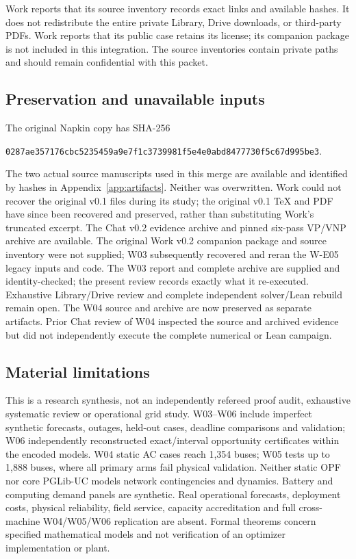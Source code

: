 \documentclass[11pt,letterpaper]{article}
\begin{document}
Work reports that its source inventory records exact links and available hashes. It does not redistribute the entire private Library, Drive downloads, or third-party PDFs. Work reports that its public case retains its license; its companion package is not included in this integration. The source inventories contain private paths and should remain confidential with this packet.

\subsection{Preservation and unavailable inputs}
The original Napkin copy has SHA-256\par\texttt{0287ae357176cbc5235459a9e7f1c37399}\newline\texttt{81f5e4e0abd8477730f5c67d995be3}.\par The two actual source manuscripts used in this merge are available and identified by hashes in Appendix~\ref{app:artifacts}. Neither was overwritten. Work could not recover the original v0.1 files during its study; the original v0.1 TeX and PDF have since been recovered and preserved, rather than substituting Work's truncated excerpt. The Chat v0.2 evidence archive and pinned six-pass VP/VNP archive are available. The original Work v0.2 companion package and source inventory were not supplied; W03 subsequently recovered and reran the W-E05 legacy inputs and code. The W03 report and complete archive are supplied and identity-checked; the present review records exactly what it re-executed. Exhaustive Library/Drive review and complete independent solver/Lean rebuild remain open. The W04 source and archive are now preserved as separate artifacts. Prior Chat review of W04 inspected the source and archived evidence but did not independently execute the complete numerical or Lean campaign.

\subsection{Material limitations}
This is a research synthesis, not an independently refereed proof audit, exhaustive systematic review or operational grid study. W03--W06 include imperfect synthetic forecasts, outages, held-out cases, deadline comparisons and validation; W06 independently reconstructed exact/interval opportunity certificates within the encoded models. W04 static AC cases reach 1,354 buses; W05 tests up to 1,888 buses, where all primary arms fail physical validation. Neither static OPF nor core PGLib-UC models network contingencies and dynamics. Battery and computing demand panels are synthetic. Real operational forecasts, deployment costs, physical reliability, field service, capacity accreditation and full cross-machine W04/W05/W06 replication are absent. Formal theorems concern specified mathematical models and not verification of an optimizer implementation or plant.
\end{document}
